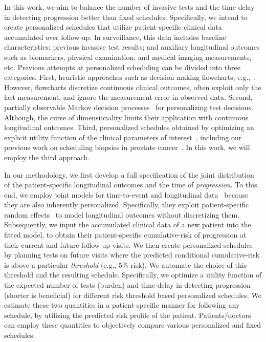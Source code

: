 In this work, we aim to balance the number of invasive tests and the time delay in detecting progression better than fixed schedules. Specifically, we intend to create personalized schedules that utilize patient-specific clinical data accumulated over follow-up. In surveillance, this data includes baseline characteristics; previous invasive test results; and auxiliary longitudinal outcomes such as biomarkers, physical examination, and medical imaging measurements, etc. Previous attempts at personalized scheduling can be divided into three categories. First, heuristic approaches such as decision making flowcharts, e.g.,~\citet{bokhorst2015compliance}. However, flowcharts discretize continuous clinical outcomes, often exploit only the last measurement, and ignore the measurement error in observed data. Second, partially observable Markov decision processes~\citep{alagoz2010operations, steimle2017markov} for personalizing test decisions. Although, the curse of dimensionality limits their application with continuous longitudinal outcomes. Third, personalized schedules obtained by optimizing an explicit utility function of the clinical parameters of interest~\citep{bebu2017optimal,rizopoulos2015personalized}, including our previous work on scheduling biopsies in prostate cancer~\citep{tomer2019personalized}. In this work, we will employ the third approach.

In our methodology, we first develop a full specification of the joint distribution of the patient-specific longitudinal outcomes and the time of \textit{progression}. To this end, we employ joint models for time-to-event and longitudinal data~\citep{tsiatis2004joint,rizopoulos2012joint} because they are also inherently personalized. Specifically, they exploit patient-specific random effects~\citep{mcculloch2005generalized} to model longitudinal outcomes without discretizing them. Subsequently, we input the accumulated clinical data of a new patient into the fitted model, to obtain their patient-specific cumulative-risk of progression at their current and future follow-up visits. We then create personalized schedules by planning tests on future visits where the predicted conditional cumulative-risk is above a particular \textit{threshold} (e.g., 5\% risk). We automate the choice of this threshold and the resulting schedule. Specifically, we optimize a utility function of the expected number of tests (burden) and time delay in detecting progression (shorter is beneficial) for different risk threshold based personalized schedules. We estimate these two quantities in a patient-specific manner for following any schedule, by utilizing the predicted risk profile of the patient. Patients/doctors can employ these quantities to objectively compare various personalized and fixed schedules.

